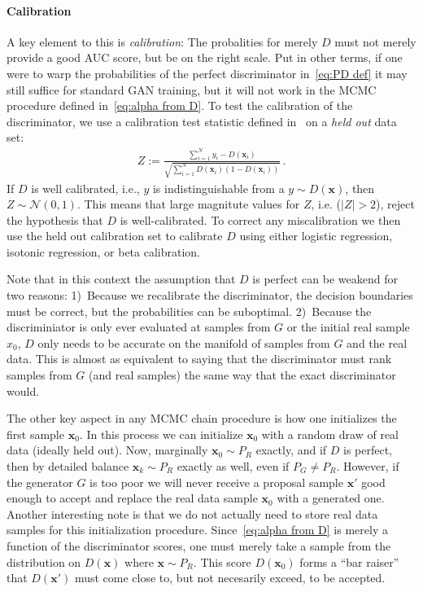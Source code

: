 \documentclass{article}
\renewcommand{\vec}[1]{{\boldsymbol{\mathbf{#1}}}} %
\newcommand{\sample}{\sim}
\newcommand{\norm}{\mathcal{N}}
\begin{document}
\paragraph{Calibration}
A key element to this is \emph{calibration}: The probalities for merely $D$ must not merely provide a good AUC score, but be on the right scale.
Put in other terms, if one were to warp the probabilities of the perfect discriminator in~\eqref{eq:PD def} it may still suffice for standard GAN training, but it will not work in the MCMC procedure defined in~\eqref{eq:alpha from D}.
To test the calibration of the discriminator, we use a calibration test statistic defined in~\citet{} on a \emph{held out} data set:  %
\begin{align}
  Z := \frac{\sum_{i=1}^N y_i - D(\vec x_i)}{\sqrt{\sum_{i=1}^N D(\vec x_i) (1 - D(\vec x_i))}}\,.
\end{align}
If $D$ is well calibrated, i.e., $y$ is indistinguishable from a $y \sample D(\vec x)$, then $Z \sample \norm(0,1)$.
This means that large magnitute values for $Z$, i.e. ($|Z| > 2$), reject the hypothesis that $D$ is well-calibrated.
To correct any miscalibration we then use the held out calibration set to calibrate $D$ using either logistic regression, isotonic regression, or beta calibration.

Note that in this context the assumption that $D$ is perfect can be weakend for two reasons:
1)~Because we recalibrate the discriminator, the decision boundaries must be correct, but the probabilities can be suboptimal.
2)~Because the discriminiator is only ever evaluated at samples from $G$ or the initial real sample $x_0$, $D$ only needs to be accurate on the manifold of samples from $G$ and the real data.
This is almost as equivalent to saying that the discriminator must rank samples from $G$ (and real samples) the same way that the exact discriminator would.

The other key aspect in any MCMC chain procedure is how one initializes the first sample $\vec x_0$.
In this process we can initialize $\vec x_0$ with a random draw of real data (ideally held out)\@.
Now, marginally $\vec x_0 \sample P_R$ exactly, and if $D$ is perfect, then by detailed balance $\vec x_k \sample P_R$ exactly as well, even if $P_G \neq P_R$.
However, if the generator $G$ is too poor we will never receive a proposal sample $\vec x'$ good enough to accept and replace the real data sample $\vec x_0$ with a generated one.
Another interesting note is that we do not actually need to store real data samples for this initialization procedure.
Since~\eqref{eq:alpha from D} is merely a function of the discriminator scores, one must merely take a sample from the distribution on $D(\vec x)$ where $\vec x \sample P_R$.
This score $D(\vec x_0)$ forms a ``bar raiser'' that $D(\vec x')$ must come close to, but not necesarily exceed, to be accepted.
\end{document}

